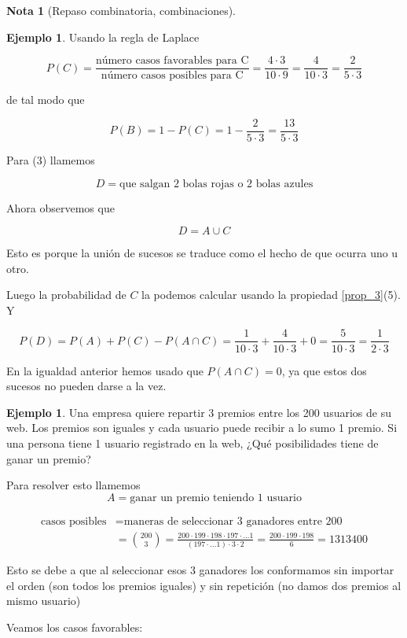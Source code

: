 \documentclass[]{book}
\theoremstyle{plain}
\theoremstyle{definition}
\newtheorem{note}[theorem]{Nota}
\newtheorem{example}[theorem]{Ejemplo}
\theoremstyle{definition} %
\begin{document}
\begin{note}[Repaso combinatoria, combinaciones]
\begin{example}
  Usando la regla de Laplace

  \[P(C) = \frac{\text{número casos favorables para C}}{\text{número casos posibles para C}} 
  = \frac{4\cdot 3 }{10\cdot 9}=\frac{4}{10\cdot 3}=\frac{2}{5\cdot 3}\]


  de tal modo que 

  \[P(B)= 1- P(C) = 1- \frac{2}{5\cdot 3} = \frac{13}{5\cdot 3}\]

  Para (3) llamemos 

  \[D = \text{que salgan 2 bolas rojas o 2 bolas azules}\]

  Ahora observemos que 

  \[D = A \cup C\]

  Esto es porque la unión de sucesos se traduce como el hecho de que ocurra uno u otro.

  Luego  la probabilidad de $C$ la podemos calcular usando la propiedad \ref{prop_3}(5). Y

  \[ P(D) = P(A) + P(C) - P(A\cap C) = \frac{1}{10\cdot 3} + \frac{4}{10\cdot 3} + 0 =  \frac{5}{10\cdot 3} =  \frac{1}{2\cdot 3}\]

  En la igualdad anterior hemos usado que $P(A\cap C)=0$, ya que estos dos sucesos no pueden darse a la vez.

\end{example}


\begin{example}
  Una empresa quiere repartir 3 premios entre los 200 usuarios de su web. Los premios son iguales y cada usuario puede recibir a lo sumo 1 premio.
  Si una persona tiene 1 usuario registrado en la web, ¿Qué posibilidades tiene de ganar un premio? 

  Para resolver esto llamemos
  $$A=\text{ganar un premio teniendo 1 usuario}$$

\begin{align*}
  \text{casos posibles}&= \text{maneras de seleccionar 3 ganadores entre 200}\\
  &={200 \choose 3} = \frac{200 \cdot 199 \cdot 198 \cdot 197 \cdot \ldots 1 }{(197 \cdot \ldots 1)\cdot 3\cdot 2} = \frac{200 \cdot 199 \cdot 198}{6} = 1313400
\end{align*}

Esto se debe a que al seleccionar esos 3 ganadores los conformamos sin importar el orden (son todos los premios iguales) y sin repetición (no damos dos premios al mismo usuario)
  
Veamos los casos favorables: 


\end{example}
\end{note}
\end{document}
